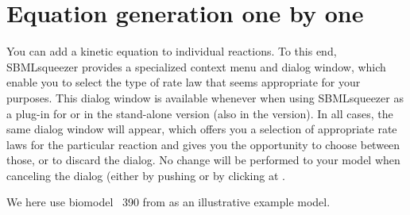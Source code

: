 \section{Equation generation one by one}
\label{sec:EquationsOneByOne}

You can add a kinetic equation to individual reactions.
To this end, SBMLsqueezer provides a specialized context menu and dialog window, which enable you to select the type of rate law that seems appropriate for your purposes.
This dialog window is available whenever when using SBMLsqueezer as a plug-in for \CellDesigner or in the stand-alone version (also in the \Garuda version).
In all cases, the same dialog window will appear, which offers you a selection of appropriate rate laws for the particular reaction and gives you the opportunity to choose between those, or to discard the dialog.
No change will be performed to your model when canceling the dialog (either by pushing \keys{\escwin} or by clicking at .

We here use biomodel \numero~390 from \BioModels \citep{Li2010a} as an illustrative example model.

